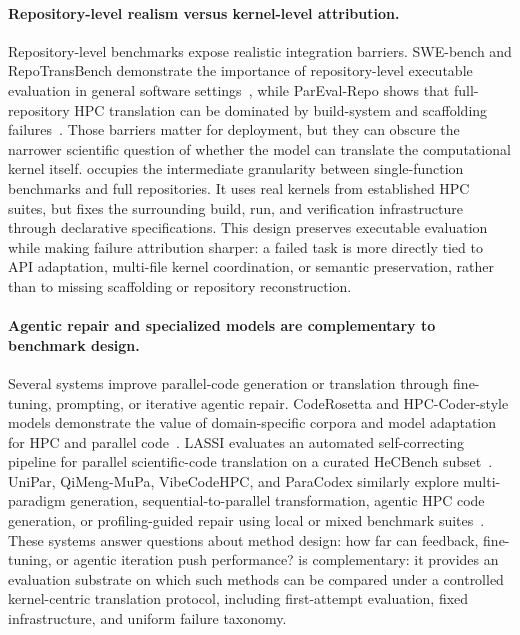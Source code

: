 \paragraph{Repository-level realism versus kernel-level attribution.}
Repository-level benchmarks expose realistic integration barriers. SWE-bench and RepoTransBench demonstrate the importance of repository-level executable evaluation in general software settings~\cite{SWEbench2024,Wang2026RepoTransBench}, while ParEval-Repo shows that full-repository HPC translation can be dominated by build-system and scaffolding failures~\cite{ParEvalRepo2025}. Those barriers matter for deployment, but they can obscure the narrower scientific question of whether the model can translate the computational kernel itself. \parbench{} occupies the intermediate granularity between single-function benchmarks and full repositories. It uses real kernels from established HPC suites, but fixes the surrounding build, run, and verification infrastructure through declarative specifications. This design preserves executable evaluation while making failure attribution sharper: a failed task is more directly tied to API adaptation, multi-file kernel coordination, or semantic preservation, rather than to missing scaffolding or repository reconstruction.

\paragraph{Agentic repair and specialized models are complementary to benchmark design.}
Several systems improve parallel-code generation or translation through fine-tuning, prompting, or iterative agentic repair. CodeRosetta and HPC-Coder-style models demonstrate the value of domain-specific corpora and model adaptation for HPC and parallel code~\cite{CodeRosetta2024,HPCCoder2024,HPCCoderV2}. LASSI evaluates an automated self-correcting pipeline for parallel scientific-code translation on a curated HeCBench subset~\cite{LASSI2024}. UniPar, QiMeng-MuPa, VibeCodeHPC, and ParaCodex similarly explore multi-paradigm generation, sequential-to-parallel transformation, agentic HPC code generation, or profiling-guided repair using local or mixed benchmark suites~\cite{UniPar2025,QiMengMuPa2025,VibeCodeHPC2025,ParaCodex2026}. These systems answer questions about method design: how far can feedback, fine-tuning, or agentic iteration push performance? \parbench{} is complementary: it provides an evaluation substrate on which such methods can be compared under a controlled kernel-centric translation protocol, including first-attempt evaluation, fixed infrastructure, and uniform failure taxonomy.

